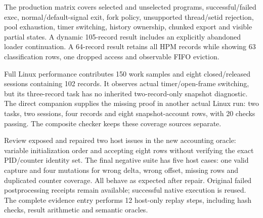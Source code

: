 The production matrix covers selected and unselected programs, successful/failed exec, normal/default-signal exit, fork policy, unsupported thread/setid rejection, pool exhaustion, timer switching, history ownership, chunked export and visible partial states. A dynamic 105-record result includes an explicitly abandoned loader continuation. A 64-record result retains all HPM records while showing 63 classification rows, one dropped access and observable FIFO eviction.

Full Linux performance contributes 150 work samples and eight closed/released sessions containing 102 records. It observes actual timer/open-frame switching, but its three-record task has no inherited two-record-only snapshot diagnostic. The direct companion supplies the missing proof in another actual Linux run: two tasks, two sessions, four records and eight snapshot-account rows, with 20 checks passing. The composite checker keeps these coverage sources separate.

Review exposed and repaired two host issues in the new accounting oracle: variable initialization order and accepting eight rows without verifying the exact PID/counter identity set. The final negative suite has five host cases: one valid capture and four mutations for wrong delta, wrong offset, missing rows and duplicated counter coverage. All behave as expected after repair. Original failed postprocessing receipts remain available; successful native execution is reused. The complete evidence entry performs 12 host-only replay steps, including hash checks, result arithmetic and semantic oracles.
